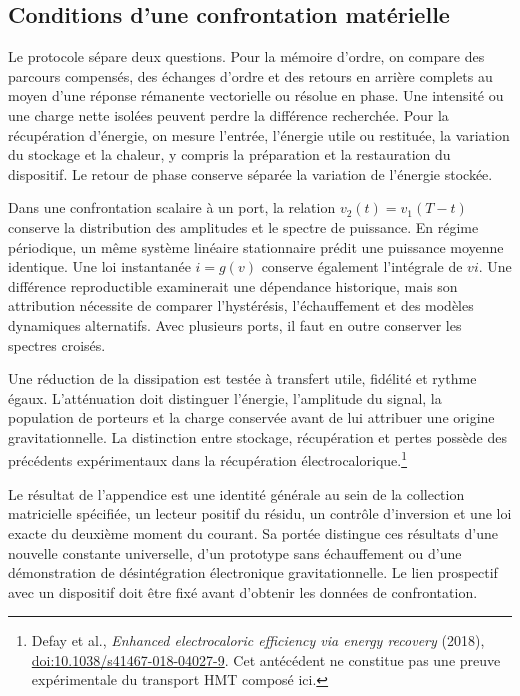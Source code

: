 \subsection{Conditions d’une confrontation matérielle}
\label{md:aux:contraste-material}

Le protocole sépare deux questions. Pour la mémoire d’ordre,
on compare des parcours compensés, des échanges d’ordre et des
retours en arrière complets au moyen d’une réponse rémanente vectorielle
ou résolue en phase. Une intensité ou une charge nette isolées
peuvent perdre la différence recherchée. Pour la récupération
d’énergie, on mesure l’entrée, l’énergie utile ou restituée, la variation
du stockage et la chaleur, y compris la préparation et la restauration
du dispositif. Le retour de phase conserve séparée la
variation de l’énergie stockée.

Dans une confrontation scalaire à un port, la relation
$v_2(t)=v_1(T-t)$ conserve la distribution des amplitudes et le
spectre de puissance. En régime périodique, un même système
linéaire stationnaire prédit une puissance moyenne identique. Une loi
instantanée $i=g(v)$ conserve également l’intégrale de $vi$.
Une différence reproductible examinerait une dépendance historique,
mais son attribution nécessite de comparer l’hystérésis, l’échauffement
et des modèles dynamiques alternatifs. Avec plusieurs ports, il faut
en outre conserver les spectres croisés.

Une réduction de la dissipation est testée à transfert
utile, fidélité et rythme égaux. L’atténuation doit distinguer l’énergie,
l’amplitude du signal, la population de porteurs et la charge conservée
avant de lui attribuer une origine gravitationnelle. La distinction entre
stockage, récupération et pertes possède des précédents
expérimentaux dans la récupération électrocalorique.\footnote{Defay
et al., \emph{Enhanced electrocaloric efficiency via energy
recovery} (2018),
\href{https://doi.org/10.1038/s41467-018-04027-9}{doi:10.1038/s41467-018-04027-9}.
Cet antécédent ne constitue pas une preuve expérimentale du
transport HMT composé ici.}

Le résultat de l’appendice est une identité générale au sein
de la collection matricielle spécifiée, un lecteur positif du
résidu, un contrôle d’inversion et une loi exacte du deuxième
moment du courant. Sa portée distingue ces résultats
d’une nouvelle constante universelle, d’un prototype sans échauffement
ou d’une démonstration de désintégration électronique gravitationnelle.
Le lien prospectif avec un dispositif doit être fixé
avant d’obtenir les données de confrontation.

